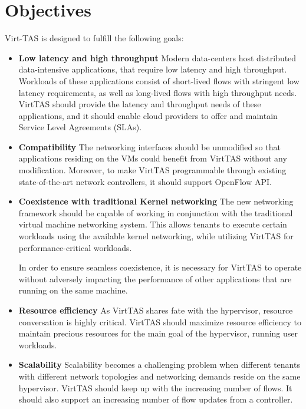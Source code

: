 
\section{Objectives}
Virt-TAS is designed to fulfill the following goals:

\begin{itemize}
    \item \textbf{Low latency and high throughput} %
    Modern data-centers host distributed data-intensive applications, that require 
    low latency and high throughput. Workloads of these applications consist of short-lived 
    flows with stringent low latency requirements, as well as long-lived flows with 
    high throughput needs. VirtTAS should provide the latency and throughput needs 
    of these applications, and it should enable cloud providers to offer and maintain
    Service Level Agreements (SLAs). 
    
    \item \textbf{Compatibility} %
    The networking interfaces should be unmodified so that applications residing on 
    the VMs could benefit from VirtTAS without any modification.
    Moreover, to make VirtTAS programmable through existing state-of-the-art network controllers,
    it should support OpenFlow API.

    \item \textbf{Coexistence with traditional Kernel networking}
    The new networking framework should be capable of working in conjunction with the 
    traditional virtual machine networking system. This allows tenants to execute certain
    workloads using the available kernel networking, while utilizing VirtTAS for
    performance-critical workloads.
    
    In order to ensure seamless coexistence, it is 
    necessary for VirtTAS to operate without adversely impacting the performance of 
    other applications that are running on the same machine. 

    \item \textbf{Resource efficiency}
    As VirtTAS shares fate with the hypervisor, resource conversation is highly critical. 
    VirtTAS should maximize resource efficiency to maintain precious resources for the 
    main goal of the hypervisor, running user workloads.

    \item \textbf{Scalability} %
    Scalability becomes a challenging problem when different tenants with different network 
    topologies and networking demands reside on the same hypervisor. VirtTAS should keep up 
    with the increasing number of flows. It should also support an increasing number of flow 
    updates from a controller.
\end{itemize}


